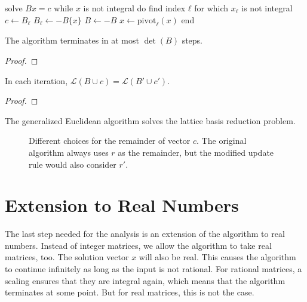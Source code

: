 \begin{Pseudocode}[float=tb, caption={The Modified Algorithm.}, label={lst:modified-generalized-euclidean}]
solve $Bx = c$
while $x$ is not integral do
  find index $ℓ$ for which $x_ℓ$ is not integral
  $c ← B_ℓ$
  $B_ℓ ← -B\{x\}$
  $B ← -B$
  $x ← \mathrm{pivot}_ℓ(x)$
end
\end{Pseudocode}

\begin{lemma}
  The algorithm terminates in at most $\det(B)$ steps.
\end{lemma}

\begin{proof}

\end{proof}

\begin{lemma}
  In each iteration, $\mathcal L(B ∪ c) = \mathcal L(B' ∪ c')$.
\end{lemma}

\begin{proof}

\end{proof}

\begin{theorem}
  The generalized Euclidean algorithm solves the lattice basis reduction problem.
\end{theorem}

\begin{figure}[t]
  \centering
  
  \caption{
    Different choices for the remainder of vector $c$. The original algorithm
    always uses $r$ as the remainder, but the modified update rule would also consider $r'$.}
\end{figure}

\section{Extension to Real Numbers}

The last step needed for the analysis is an extension of the algorithm to real
numbers.
Instead of integer matrices, we allow the algorithm to take real matrices, too.
The solution vector $x$ will also be real.
This causes the algorithm to continue infinitely as long as the input is not rational.
For rational matrices, a scaling ensures that they are integral again, which
means that the algorithm terminates at some point.
But for real matrices, this is not the case.

